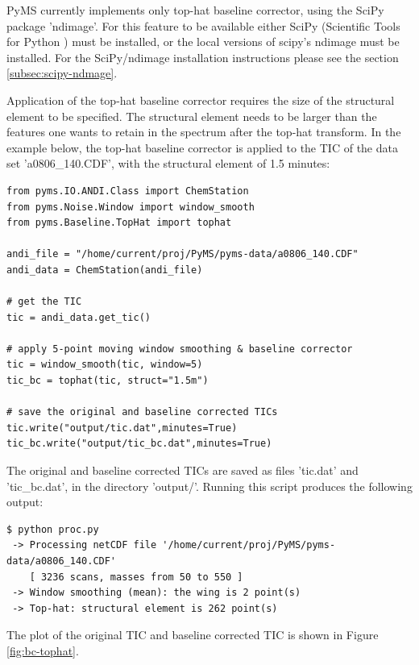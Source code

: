 PyMS currently implements only top-hat baseline corrector, using the SciPy
package 'ndimage'. For this feature to be available either SciPy (Scientific
Tools for Python \cite{scipy}) must be installed, or the local versions of
scipy's ndimage must be installed. For the SciPy/ndimage installation
instructions please see the section \ref{subsec:scipy-ndmage}.

Application of the top-hat baseline corrector requires the size of the structural
element to be specified. The structural element needs to be larger than the
features one wants to retain in the spectrum after the top-hat transform.
In the example below, the top-hat baseline corrector is applied to the TIC
of the data set 'a0806\_140.CDF', with the structural element of 1.5 minutes:

\begin{verbatim}
from pyms.IO.ANDI.Class import ChemStation
from pyms.Noise.Window import window_smooth
from pyms.Baseline.TopHat import tophat

andi_file = "/home/current/proj/PyMS/pyms-data/a0806_140.CDF"
andi_data = ChemStation(andi_file)

# get the TIC
tic = andi_data.get_tic()

# apply 5-point moving window smoothing & baseline corrector
tic = window_smooth(tic, window=5)
tic_bc = tophat(tic, struct="1.5m")

# save the original and baseline corrected TICs
tic.write("output/tic.dat",minutes=True)
tic_bc.write("output/tic_bc.dat",minutes=True)
\end{verbatim}

\noindent
The original and baseline corrected TICs are saved as files 'tic.dat' and
'tic\_bc.dat', in the directory 'output/'. Running this script produces the
following output:

\begin{verbatim}
$ python proc.py
 -> Processing netCDF file '/home/current/proj/PyMS/pyms-data/a0806_140.CDF'
    [ 3236 scans, masses from 50 to 550 ]
 -> Window smoothing (mean): the wing is 2 point(s)
 -> Top-hat: structural element is 262 point(s)
\end{verbatim}

The plot of the original TIC and baseline corrected TIC is shown in
Figure \ref{fig:bc-tophat}.

